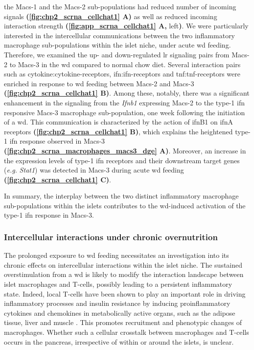 the Macs-1 and the Macs-2 sub-populations had reduced number of incoming signals \textbf{(\autoref{fig:chp2_scrna_cellchat1} A)} as well as reduced incoming interaction strength \textbf{(\autoref{fig:app_scrna_cellchat1} A,} left\textbf{)}. We were particularly interested in the intercellular communications between the two inflammatory macrophage sub-populations within the islet niche, under acute \gls{wd} feeding. Therefore, we examined the up- and down-regulated \gls{lr} signaling pairs from Macs-2 to Macs-3 in the \gls{wd} compared to normal chow diet. Several interaction pairs such as cytokine:cytokine-receptors, \gls{ifn}:\gls{ifn}-receptors and \gls{tnf}:\gls{tnf}-receptors were enriched in response to \gls{wd} feeding between Macs-2 and Macs-3 \textbf{(\autoref{fig:chp2_scrna_cellchat1} B)}. Among these, notably, there was a significant enhancement in the signaling from the \textit{Ifnb1} expressing Macs-2 to the type-1 \gls{ifn} responsive Macs-3 macrophage sub-population, one week following the initiation of a \gls{wd}. This communication is characterized by the action of \gls{ifn}B1 on \gls{ifn}A receptors \textbf{(\autoref{fig:chp2_scrna_cellchat1} B)}, which explains the heightened type-1 \gls{ifn} response observed in Macs-3 \textbf{(\autoref{fig:chp2_scrna_macrophages_macs3_dge} A)}. Moreover, an increase in the expression levels of type-1 \gls{ifn} receptors and their downstream target genes (\textit{e.g.} \textit{Stat1}) was detected in Macs-3 during acute \gls{wd} feeding \textbf{(\autoref{fig:chp2_scrna_cellchat1} C)}.\\




\par In summary, the interplay between the two distinct inflammatory macrophage sub-populations within the islets contributes to the \gls{wd}-induced activation of the type-1 \gls{ifn} response in Macs-3. 



\subsubsection{\large Intercellular interactions under chronic overnutrition}
The prolonged exposure to \gls{wd} feeding necessitates an investigation into its chronic effects on intercellular interactions within the islet niche. The sustained overstimulation from a \gls{wd} is likely to modify the interaction landscape between islet macrophages and T-cells, possibly leading to a persistent inflammatory state. Indeed, local T-cells have been shown to play an important role in driving inflammatory processes and insulin resistance by inducing proinflammatory cytokines and chemokines in metabolically active organs, such as the adipose tissue, liver and muscle \textbf{\cite{}}. This promotes recruitment and phenotypic changes of macrophages. Whether such a cellular crosstalk between macrophages and T-cells occurs in the pancreas, irrespective of within or around the islets, is unclear.\\

